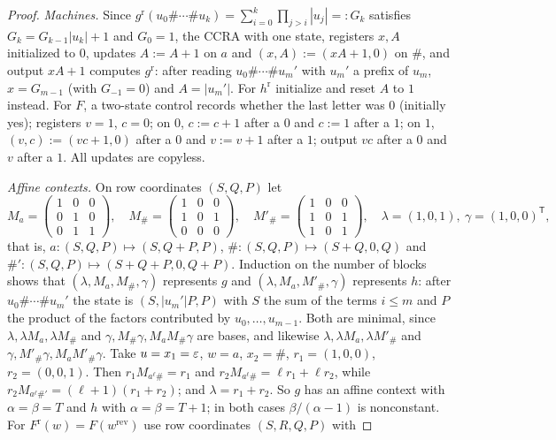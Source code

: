 \begin{proof}
\emph{Machines.} Since $g^{\mathrm r}(u_0\#\cdots\#u_k)=\sum_{i=0}^k\prod_{j>i}|u_j|=:G_k$ satisfies $G_k=G_{k-1}|u_k|+1$ and $G_0=1$, the CCRA with one state, registers $x,A$ initialized to $0$, updates $A:=A+1$ on $a$ and $(x,A):=(xA+1,0)$ on $\#$, and output $xA+1$ computes $g^{\mathrm r}$: after reading $u_0\#\cdots\#u_m'$ with $u_m'$ a prefix of $u_m$, $x=G_{m-1}$ (with $G_{-1}=0$) and $A=|u_m'|$. For $h^{\mathrm r}$ initialize and reset $A$ to $1$ instead. For $F$, a two-state control records whether the last letter was $0$ (initially yes); registers $v=1$, $c=0$; on $0$, $c:=c+1$ after a $0$ and $c:=1$ after a $1$; on $1$, $(v,c):=(vc+1,0)$ after a $0$ and $v:=v+1$ after a $1$; output $vc$ after a $0$ and $v$ after a $1$. All updates are copyless.

\emph{Affine contexts.} On row coordinates $(S,Q,P)$ let
\[
M_a=\begin{pmatrix}1&0&0\\0&1&0\\0&1&1\end{pmatrix},\quad
M_\#=\begin{pmatrix}1&0&0\\1&0&1\\0&0&0\end{pmatrix},\quad
M'_\#=\begin{pmatrix}1&0&0\\1&0&1\\1&0&1\end{pmatrix},\quad
\lambda=(1,0,1),\ \gamma=(1,0,0)^{\mathsf T},
\]
that is, $a:(S,Q,P)\mapsto(S,Q+P,P)$, $\#:(S,Q,P)\mapsto(S+Q,0,Q)$ and $\#':(S,Q,P)\mapsto(S+Q+P,0,Q+P)$. Induction on the number of blocks shows that $(\lambda,M_a,M_\#,\gamma)$ represents $g$ and $(\lambda,M_a,M'_\#,\gamma)$ represents $h$: after $u_0\#\cdots\#u_m'$ the state is $(S,|u_m'|P,P)$ with $S$ the sum of the terms $i\le m$ and $P$ the product of the factors contributed by $u_0,\ldots,u_{m-1}$. Both are minimal, since $\lambda,\lambda M_a,\lambda M_\#$ and $\gamma,M_\#\gamma,M_aM_\#\gamma$ are bases, and likewise $\lambda,\lambda M_a,\lambda M'_\#$ and $\gamma,M'_\#\gamma,M_aM'_\#\gamma$. Take $u=x_1=\varepsilon$, $w=a$, $x_2=\#$, $r_1=(1,0,0)$, $r_2=(0,0,1)$. Then $r_1M_{a^\ell\#}=r_1$ and $r_2M_{a^\ell\#}=\ell r_1+\ell r_2$, while $r_2M_{a^\ell\#'}=(\ell+1)(r_1+r_2)$; and $\lambda=r_1+r_2$. So $g$ has an affine context with $\alpha=\beta=T$ and $h$ with $\alpha=\beta=T+1$; in both cases $\beta/(\alpha-1)$ is nonconstant. For $F^{\mathrm r}(w)=F(w^{\mathrm{rev}})$ use row coordinates $(S,R,Q,P)$ with

\end{proof}
